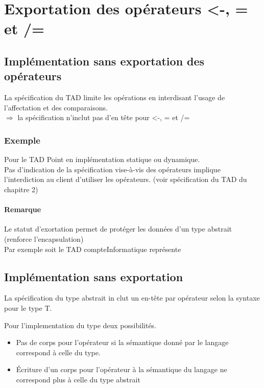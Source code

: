 \section{Exportation des opérateurs <-, = et /=}
	\subsection{Implémentation sans exportation des opérateurs}
		La spécification du TAD limite les opérations en interdisant l'usage de l'affectation et des 
		comparaisons.\\
		$\Rightarrow$ la spécification n'inclut pas d'en tête pour <-, = et /=
		\subsubsection{Exemple}
			Pour le TAD Point en implémentation statique ou dynamique. \\
			Pas d'indication de la spécification vise-à-vis des opérateurs implique l'interdiction au client
			d'utiliser les opérateurs. (voir spécification du TAD du chapitre 2) 
			
		\paragraph{Remarque} 
			Le statut d'exortation permet de protéger les données d'un type abstrait 
			(renforce l'encapsulation)\\
			Par exemple soit le TAD compteInformatique représente
			
	\subsection{Implémentation sans exportation}
		La spécification du type abstrait in clut un en-tête par opérateur selon la syntaxe pour le type T.	
			
			
			Pour l'implementation du type deux possibilités.
			\begin{itemize}
				\item Pas de corps pour l'opérateur si la sémantique donné par le langage correspond à
					celle du type.
				\item Écriture d'un corps pour l'opérateur à la sémantique du langage ne correspond plus
					à celle du type abstrait
			\end{itemize}	
